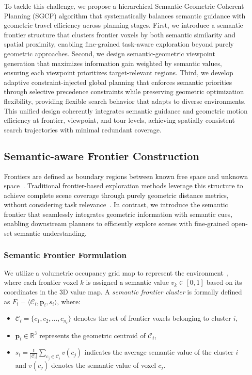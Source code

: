 To tackle this challenge, we propose a hierarchical Semantic-Geometric Coherent Planning (SGCP) algorithm that systematically balances semantic guidance with geometric travel efficiency across planning stages. First, we introduce a semantic frontier structure that clusters frontier voxels by both semantic similarity and spatial proximity, enabling fine-grained task-aware exploration beyond purely geometric approaches. Second, we design semantic-geometric viewpoint generation that maximizes information gain weighted by semantic values, ensuring each viewpoint prioritizes target-relevant regions. Third, we develop adaptive constraint-injected global planning that enforces semantic priorities through selective precedence constraints while preserving geometric optimization flexibility, providing flexible search behavior that adapts to diverse environments. This unified design coherently integrates semantic guidance and geometric motion efficiency at frontier, viewpoint, and tour levels, achieving spatially consistent search trajectories with minimal redundant coverage.


\subsection{Semantic-aware Frontier Construction}\label{V-A}
Frontiers are defined as boundary regions between known free space and unknown space~\cite{yamauchi1997frontier}. 
Traditional frontier-based exploration methods leverage this structure to achieve complete scene coverage through purely geometric distance metrics, without considering task relevance~\cite{zhang2024falcon}. 
In contrast, we introduce the semantic frontier that seamlessly integrates geometric information with semantic cues, enabling downstream planners to efficiently explore scenes with fine-grained open-set semantic understanding.

\subsubsection{Semantic Frontier Formulation}
We utilize a volumetric occupancy grid map to represent the environment~\cite{han2019fiesta}, where each frontier voxel $k$ is assigned a semantic value $v_k \in [0,1]$ based on its coordinates in the 3D value map.
A \textit{semantic frontier cluster} is formally defined as $F_i = \langle \mathcal{C}_i, \mathbf{p}_i, s_i \rangle$, where:
\begin{itemize}
    \item $\mathcal{C}_i = \{c_1, c_2, \ldots, c_{n_i}\}$ denotes the set of frontier voxels belonging to cluster $i$,
    \item $\mathbf{p}_i \in \mathbb{R}^3$ represents the geometric centroid of $\mathcal{C}_i$,
    \item $s_i = \frac{1}{|\mathcal{C}_i|}\sum_{c_j \in \mathcal{C}_i} v(c_j)$ indicates the average semantic value of the cluster $i$ and $v(c_j)$ denotes the semantic value of voxel $c_j$.
\end{itemize}


